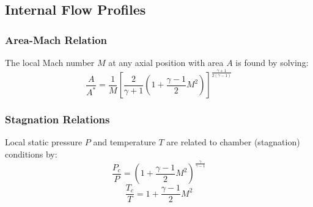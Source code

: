 \subsection{Internal Flow Profiles}

\subsubsection{Area-Mach Relation}
The local Mach number $M$ at any axial position with area $A$ is found by solving:
\begin{equation}
\frac{A}{A^*} = \frac{1}{M} \left[\frac{2}{\gamma+1} \left(1 + \frac{\gamma-1}{2} M^2\right)\right]^{\frac{\gamma+1}{2(\gamma-1)}}
\end{equation}

\subsubsection{Stagnation Relations}
Local static pressure $P$ and temperature $T$ are related to chamber (stagnation) conditions by:
\begin{equation}
\frac{P_c}{P} = \left(1 + \frac{\gamma-1}{2} M^2\right)^{\frac{\gamma}{\gamma-1}}
\end{equation}
\begin{equation}
\frac{T_c}{T} = 1 + \frac{\gamma-1}{2} M^2
\end{equation}
